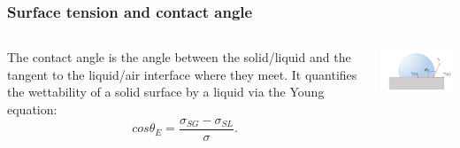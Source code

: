 \documentclass[xcolor=table]{beamer}
\begin{document}
\begin{frame}

\frametitle{Surface tension and contact angle}

\fontsize{11}{13.2} \selectfont

\begin{columns}
\begin{column}{.55\textwidth}
The contact angle is the angle between the solid/liquid and the tangent  to the liquid/air interface where they meet. It quantifies the wettability of a solid surface by a liquid via the Young equation:
\begin{equation}
cos\theta_E=\frac{\sigma_{SG}-\sigma_{SL}}{\sigma}.
\end{equation}
\end{column}
\begin{column}{.3\textwidth}
\includegraphics[width=1.2\columnwidth]{angolo.png}\\
\end{column}
\end{columns}
\end{frame}
\end{document}
